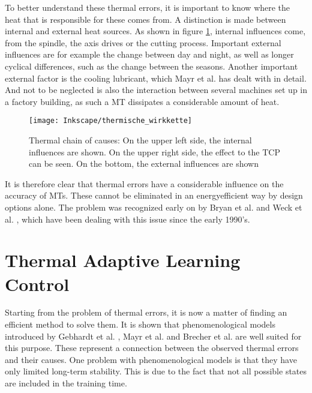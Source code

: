 To better understand these thermal errors, it is important to know where the heat that is responsible for these comes from. A distinction is made between internal and external heat sources. As shown in figure \ref{fig:thermalcauses}, internal influences come, from the spindle, the axis drives or the cutting process. Important external influences are for example the change between day and night, as well as longer cyclical differences, such as the change between the seasons. Another important external factor is the cooling lubricant, which Mayr et al. \cite{Mayr_2014,Mayr_2015} has dealt with in detail. And not to be neglected is also the interaction between several machines set up in a factory building, as such a MT dissipates a considerable amount of heat. 

\begin{figure}[!htb]
    \centering
    \texttt{[image: Inkscape/thermische\_wirkkette]} %
    \caption[Thermal chain of causes]{Thermal chain of causes: On the upper left side, the internal influences are shown. On the upper right side, the effect to the TCP can be seen. On the bottom, the external influences are shown}
    \label{fig:thermalcauses}
\end{figure}

It is therefore clear that thermal errors have a considerable influence on the accuracy of MTs. These cannot be eliminated in an energyefficient way by design options alone. The problem was recognized early on by Bryan et al. \cite{Bryan_1990} and Weck et al. \cite{Weck_1995}, which have been dealing with this issue since the early 1990's.



\section{Thermal Adaptive Learning Control}
\label{sec:TALC}

Starting from the problem of thermal errors, it is now a matter of finding an efficient method to solve them. It is shown that phenomenological models introduced by Gebhardt et al. \cite{Gebhardt_2014}, Mayr et al. \cite{Mayr_2015} and Brecher et al. \cite{Brecher_2004} are well suited for this purpose. These represent a connection between the observed thermal errors and their causes. One problem with phenomenological models is that they have only limited long-term stability. This is due to the fact that not all possible states are included in the training time.

